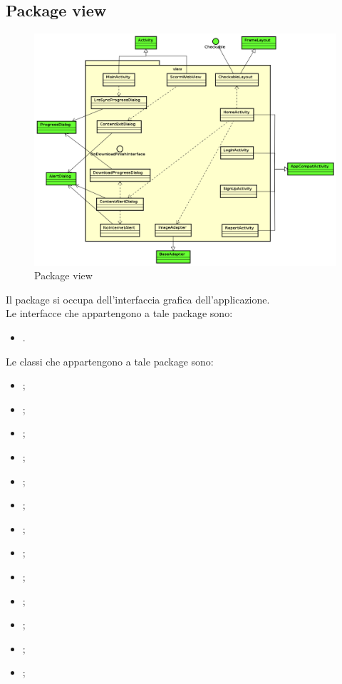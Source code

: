 \documentclass[../Tesi.tex]{subfiles}
\begin{document}
	\subsection{Package view}
		\begin{figure}[H]
			\centering
			\includegraphics[scale=0.4]{images/package_diagrams/view}
				\caption{Package view}
		\end{figure}
		Il package  si occupa dell'interfaccia grafica dell'applicazione. \\
		Le interfacce che appartengono a tale package sono:
		\begin{itemize}
			\item {}.
		\end{itemize}
		Le classi che appartengono a tale package sono:
		\begin{itemize}
			\item {};
			\item {};
			\item {};
			\item {};
			\item {};
			\item {};
			\item {};
			\item {};
			\item {};
			\item {};
			\item {};
			\item {};
			\item {};
		\end{itemize}
\end{document}
